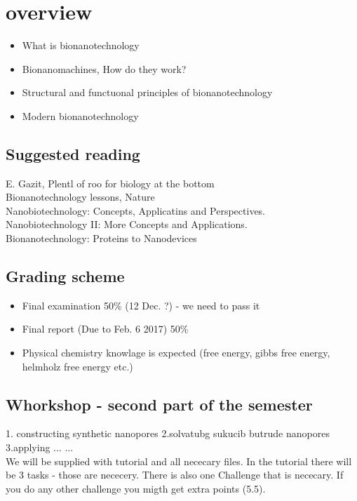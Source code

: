\documentclass{article}
\begin{document}
\section{overview}
\begin{itemize}

 \item What is bionanotechnology

 \item Bionanomachines, How do they work? 
 
 \item Structural and functuonal principles of bionanotechnology

 \item Modern bionanotechnology

\end{itemize}

\subsection{Suggested reading}

E. Gazit, Plentl of roo for biology at the bottom
\\
Bionanotechnology lessons, Nature
\\
Nanobiotechnology: Concepts, Applicatins and Perspectives.
\\
Nanobiotechnology II: More Concepts and Applications.
\\
Bionanotechnology: Proteins to Nanodevices

\subsection{Grading scheme}
\begin{itemize}
 \item Final examination 50\% (12 Dec. ?) - we need to pass it
 \item Final report (Due to Feb. 6 2017) 50\%
 \item Physical chemistry knowlage is expected (free energy, gibbs free energy, helmholz free energy etc.)
\end{itemize}

\subsection{Whorkshop - second part of the semester}
 
 1. constructing synthetic nanopores
 2.solvatubg sukucib butrude nanopores
 3.applying ...
 ...
\\
We will be supplied with tutorial and all nececary files. In the tutorial there will be 3 tasks - those are
nececery. There is also one Challenge that is nececary. If you do any other challenge you migth get extra
points (5.5).
\end{document}
